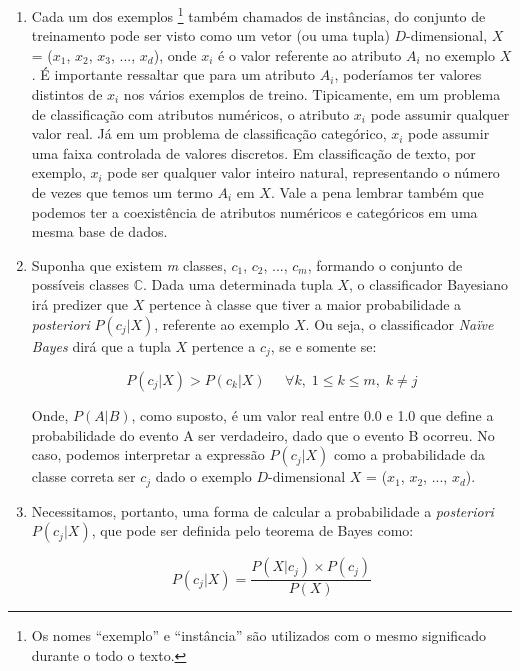 \begin{enumerate}
    \item Cada um dos exemplos \footnote{Os nomes ``exemplo'' e ``instância'' são utilizados com o mesmo significado durante o todo o texto.} também chamados de instâncias, do conjunto de treinamento pode ser visto como um vetor (ou uma tupla) $D$-dimensional, $X$ = ($x_1$, $x_2$, $x_3$, ..., $x_d$), onde $x_i$ é o valor referente ao atributo $A_i$ no exemplo $X$. É importante ressaltar que para um atributo $A_i$, poderíamos ter valores distintos de $x_i$ nos vários exemplos de treino. Tipicamente, em um problema de classificação com atributos numéricos, o atributo $x_i$ pode assumir qualquer valor real. Já em um problema de classificação categórico, $x_i$ pode assumir uma faixa controlada de valores discretos. Em classificação de texto, por exemplo, $x_i$ pode ser qualquer valor inteiro natural, representando o número de vezes que temos um termo $A_i$ em $X$. Vale a pena lembrar também que podemos ter a coexistência de atributos numéricos e categóricos em uma mesma base de dados.
    

    \item Suponha que existem \textit{m} classes, $c_1$, $c_2$, ..., $c_\textit{m}$, formando o conjunto de possíveis classes $\mathbb{C}$. Dada uma determinada tupla $X$, o classificador Bayesiano irá predizer que $X$ pertence à classe que tiver a maior probabilidade a \textit{posteriori} $P(c_j|X)$, referente ao exemplo $X$. Ou seja, o classificador \textit{Naïve Bayes} dirá que a tupla $X$ pertence a $c_j$, se e somente se:
        
\begin{equation}\label{eqn::max_pcgivenx}
   P(c_{j}|X) > P(c_{k}|X) \;\;\;\;\;\forall k,\; 1 \le k \le m, \; k \not= j
\end{equation}

Onde, $P(A|B)$, como suposto, é um valor real entre 0.0 e 1.0 que define a probabilidade do evento A ser verdadeiro, dado que o evento B ocorreu. No caso, podemos interpretar a expressão $P(c_j|X)$ como a probabilidade da classe correta ser $c_j$ dado o exemplo $D$-dimensional $X$ = ($x_1$, $x_2$, ..., $x_d$).

    \item Necessitamos, portanto, uma forma de calcular a probabilidade a \textit{posteriori} $P(c_j| X)$, que pode ser definida pelo teorema de Bayes como:
 
\begin{equation}\label{eqn::bayes}
   P(c_{j}|X) = \frac{P(X|c_j) \times P(c_j) }{P(X)}
\end{equation}


\end{enumerate}
